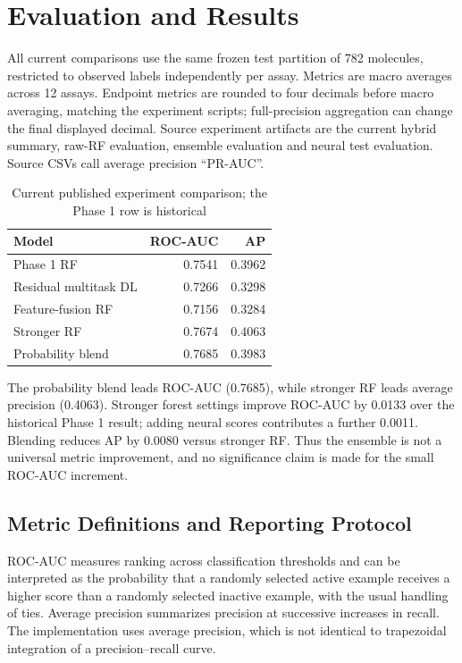 \documentclass[conference]{IEEEtran}
\begin{document}
\section{Evaluation and Results}
All current comparisons use the same frozen test partition of 782 molecules, restricted to observed labels independently per assay. Metrics are macro averages across 12 assays. Endpoint metrics are rounded to four decimals before macro averaging, matching the experiment scripts; full-precision aggregation can change the final displayed decimal. Source experiment artifacts are the current hybrid summary, raw-RF evaluation, ensemble evaluation and neural test evaluation. Source CSVs call average precision ``PR-AUC''.
\begin{table}[t]\centering\small
\caption{Current published experiment comparison; the Phase 1 row is historical}
\label{tab:main}
\begin{tabular}{lrr}\toprule Model & ROC-AUC & AP\\\midrule
Phase 1 RF & 0.7541 & 0.3962\\
Residual multitask DL & 0.7266 & 0.3298\\
Feature-fusion RF & 0.7156 & 0.3284\\
Stronger RF & 0.7674 & 0.4063\\
Probability blend & 0.7685 & 0.3983\\
\bottomrule\end{tabular}\end{table}

The probability blend leads ROC-AUC (0.7685), while stronger RF leads average precision (0.4063). Stronger forest settings improve ROC-AUC by 0.0133 over the historical Phase 1 result; adding neural scores contributes a further 0.0011. Blending reduces AP by 0.0080 versus stronger RF. Thus the ensemble is not a universal metric improvement, and no significance claim is made for the small ROC-AUC increment.

\subsection{Metric Definitions and Reporting Protocol}
ROC-AUC measures ranking across classification thresholds and can be interpreted as the probability that a randomly selected active example receives a higher score than a randomly selected inactive example, with the usual handling of ties. Average precision summarizes precision at successive increases in recall. The implementation uses average precision, which is not identical to trapezoidal integration of a precision--recall curve.
\end{document}
